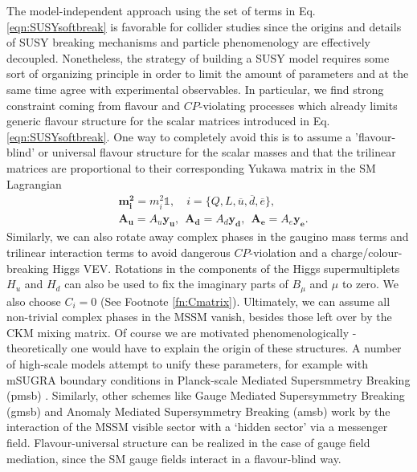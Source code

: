 The model-independent approach using the set of terms in Eq. \ref{eqn:SUSYsoftbreak} is favorable for collider studies since the origins and details of SUSY breaking mechanisms and particle phenomenology are effectively decoupled. Nonetheless, the strategy of building a SUSY model requires some sort of organizing principle in order to limit the amount of parameters and at the same time agree with experimental observables. In particular, we find strong constraint coming from flavour and $CP$-violating processes which already limits generic flavour structure for the scalar matrices introduced in Eq. \ref{eqn:SUSYsoftbreak}. One way to completely avoid this is to assume a 'flavour-blind' or universal flavour structure for the scalar masses and that the trilinear matrices are proportional to their corresponding Yukawa matrix in the SM Lagrangian
\begin{align}
&\mathbf{m^2_{i}}=m^2_{i}\mathbb{1},\quad i=\{Q,L,\overline{u},\overline{d},\overline{e}\},\\
&\mathbf{A_{u}}=A_{u}\mathbf{y_{u}},~~\mathbf{A_{d}}=A_{d}\mathbf{y_{d}},~~\mathbf{A_{e}}=A_{e}\mathbf{y_{e}}.
\end{align}
Similarly, we can also rotate away complex phases in the gaugino mass terms and trilinear interaction terms to avoid dangerous $CP$-violation and a charge/colour-breaking Higgs VEV. Rotations in the components of the Higgs supermultiplets $H_u$ and $H_d$ can also be used to fix the imaginary parts of $B_{\mu}$ and $\mu$ to zero. We also choose $C_i=0$ (See Footnote \ref{fn:Cmatrix}). Ultimately, we can assume all non-trivial complex phases in the MSSM vanish, besides those left over by the CKM mixing matrix. Of course we are motivated phenomenologically - theoretically one would have to explain the origin of these structures. A number of high-scale models attempt to unify these parameters, for example with mSUGRA boundary conditions in Planck-scale Mediated Supersmmetry Breaking (\acrshort{pmsb}) \cite{RN542,RN543,RN544,RN545,RN546,RN548,RN561,RN562,RN563}. Similarly, other schemes like Gauge Mediated Supersymmetry Breaking (\acrshort{gmsb}) \cite{RN557,RN558,RN559,RN560} and Anomaly Mediated Supersymmetry Breaking (\acrshort{amsb}) \cite{RN564,RN565} work by the interaction of the MSSM visible sector with a `hidden sector' via a messenger field. Flavour-universal structure can be realized in the case of gauge field mediation, since the SM gauge fields interact in a flavour-blind way.


